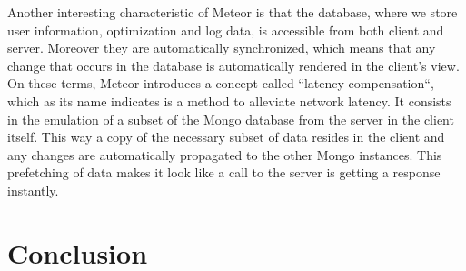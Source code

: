 \documentclass{article}
\begin{document}
\noindent Another interesting characteristic of Meteor is that the database, where we store user information, optimization and log data, is accessible from both client and server. Moreover they are automatically synchronized, which means that any change that occurs in the database is automatically rendered in the client's view. On these terms, Meteor introduces a concept called ``latency compensation``, which as its name indicates is a method to alleviate network latency. It consists in the emulation of a subset of the Mongo database from the server in the client itself. This way a copy of the necessary subset of data resides in the client and any changes are automatically propagated to the other Mongo instances. This prefetching of data makes it look like a call to the server is getting a response instantly.



\section{Conclusion}



\end{document}
